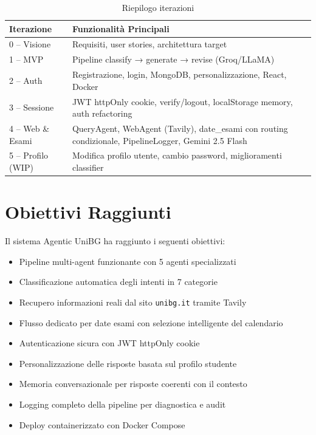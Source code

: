 \documentclass[a4paper,12pt]{report}
\begin{document}
\begin{table}[H]
\centering
\small
\begin{tabularx}{\textwidth}{l X}
\toprule
\textbf{Iterazione} & \textbf{Funzionalità Principali} \\
\midrule
0 -- Visione & Requisiti, user stories, architettura target \\
1 -- MVP & Pipeline classify → generate → revise (Groq/LLaMA) \\
2 -- Auth & Registrazione, login, MongoDB, personalizzazione, React, Docker \\
3 -- Sessione & JWT httpOnly cookie, verify/logout, localStorage memory, auth refactoring \\
4 -- Web \& Esami & QueryAgent, WebAgent (Tavily), date\_esami con routing condizionale, PipelineLogger, Gemini 2.5 Flash \\
5 -- Profilo (WIP) & Modifica profilo utente, cambio password, miglioramenti classifier \\
\bottomrule
\end{tabularx}
\caption{Riepilogo iterazioni}
\end{table}

\section{Obiettivi Raggiunti}

Il sistema Agentic UniBG ha raggiunto i seguenti obiettivi:
\begin{itemize}
    \item Pipeline multi-agent funzionante con 5 agenti specializzati
    \item Classificazione automatica degli intenti in 7 categorie
    \item Recupero informazioni reali dal sito \texttt{unibg.it} tramite Tavily
    \item Flusso dedicato per date esami con selezione intelligente del calendario
    \item Autenticazione sicura con JWT httpOnly cookie
    \item Personalizzazione delle risposte basata sul profilo studente
    \item Memoria conversazionale per risposte coerenti con il contesto
    \item Logging completo della pipeline per diagnostica e audit
    \item Deploy containerizzato con Docker Compose
\end{itemize}
\end{document}
